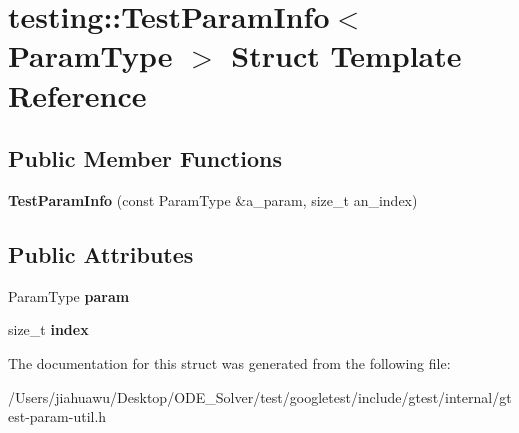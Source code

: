 \hypertarget{structtesting_1_1_test_param_info}{}\section{testing\+:\+:Test\+Param\+Info$<$ Param\+Type $>$ Struct Template Reference}
\label{structtesting_1_1_test_param_info}
\subsection*{Public Member Functions}
\begin{DoxyCompactItemize}
\item 
\mbox{\label{structtesting_1_1_test_param_info_aa54199319bcad5a33c8538ecaecb6de5}} 
{\bfseries Test\+Param\+Info} (const Param\+Type \&a\+\_\+param, size\+\_\+t an\+\_\+index)
\end{DoxyCompactItemize}
\subsection*{Public Attributes}
\begin{DoxyCompactItemize}
\item 
\mbox{\label{structtesting_1_1_test_param_info_a146d921039f9da8b1336f7cc6e8436c2}} 
Param\+Type {\bfseries param}
\item 
\mbox{\label{structtesting_1_1_test_param_info_ad4d7bc02cbcc571eb3c1d2ec3ba5bb53}} 
size\+\_\+t {\bfseries index}
\end{DoxyCompactItemize}


The documentation for this struct was generated from the following file\+:\begin{DoxyCompactItemize}
\item 
/\+Users/jiahuawu/\+Desktop/\+O\+D\+E\+\_\+\+Solver/test/googletest/include/gtest/internal/gtest-\/param-\/util.\+h\end{DoxyCompactItemize}
